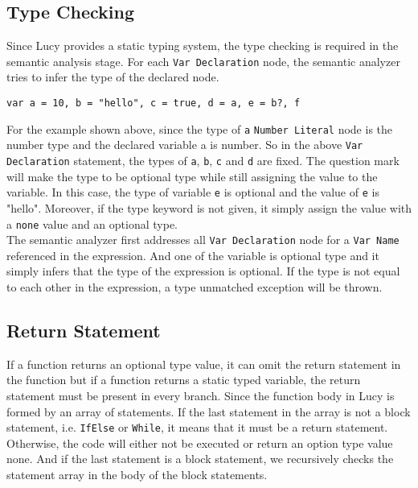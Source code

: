 \subsection{Type Checking}
Since Lucy provides a static typing system, the type checking is required in the semantic analysis stage. For each \texttt{Var Declaration} node, the semantic analyzer tries to infer the type of the declared node.
\begin{lstlisting}
var a = 10, b = "hello", c = true, d = a, e = b?, f
\end{lstlisting}
For the example shown above, since the type of \texttt{a} \texttt{Number Literal} node is the number type and the declared variable a is number. So in the above \texttt{Var Declaration} statement, the types of \texttt{a}, \texttt{b}, \texttt{c} and \texttt{d} are fixed. The question mark will make the type to be optional type while still assigning the value to the variable. In this case, the type of variable \texttt{e} is optional and the value of \texttt{e} is "hello". Moreover, if the type keyword is not given, it simply assign the value with a \texttt{none} value and an optional type. \\
The semantic analyzer first addresses all \texttt{Var Declaration} node for a \texttt{Var Name} referenced in the expression. And one of the variable is optional type and it simply infers that the type of the expression is optional. If the type is not equal to each other in the expression, a type unmatched exception will be thrown.
\subsection{Return Statement}
If a function returns an optional type value, it can omit the return statement in the function but if a function returns a static typed variable, the return statement must be present in every branch. Since the function body in Lucy is formed by an array of statements. If the last statement in the array is not a block statement, i.e. \texttt{IfElse} or \texttt{While}, it means that it must be a return statement. Otherwise, the code will either not be executed or return an option type value none. And if the last statement is a block statement, we recursively checks the statement array in the body of the block statements.


